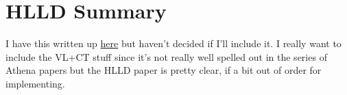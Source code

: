 \section{HLLD Summary}
\label{sec:hlld}

I have this written up \href{https://robertcaddy.com/posts/HLLD-Algorithm/}{here} but haven't decided if I'll include it. I really want to include the VL+CT stuff since it's not really well spelled out in the series of Athena papers but the HLLD paper is pretty clear, if a bit out of order for implementing.